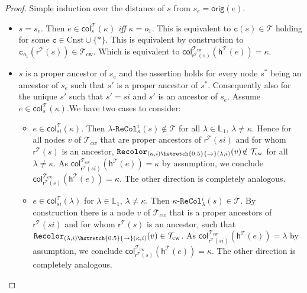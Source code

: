 \documentclass[10pt,a4paper]{amsart}
\theoremstyle{definition}
\numberwithin{equation}{section}
\theoremstyle{plain}
\theoremstyle{definition}
\theoremstyle{myexample}
\theoremstyle{plain}
\theoremstyle{definition}
\newcommand{\origcol}{o}
\newcommand{\cols}{\mathbb{L}}
\newcommand{\recol}[2]{#2\pred{\texttt{-}ReCol}_{#1}}
\newcommand{\fcn}[1]{\mathsf{#1}}
\newcommand{\col}{\fcn{col}}
\newcommand{\pred}[1]{\mathtt{#1}}
\newcommand{\const}[1]{\mathtt{#1}}
\newcommand{\iffi}{\textit{iff} } %
\newcommand{\shortto}{\hstretch{0.5}{\to}}
\begin{document}
\begin{proof}
	Simple induction over the distance of $s$ from $s_e = \fcn{orig}(e)$.
	\begin{itemize}
		\item $s = s_e$. Then $e\in\col_s^{\mathcal{T}}(\kappa)$ \iffi $\kappa = \origcol_1$. This is equivalent to $\const{c}(s)\in\mathcal{T}$ holding for some $\const{c}\in\mathrm{Cnst}{\cup}\{ \ast \}$. This is equivalent by construction to $\const{c}_{\origcol_1}(\fcn{r}^{\mathcal{T}}\!(s))\in\mathcal{T}_{\mathrm{cw}}$. Which is equivalent to $\col_{\fcn{r}^{\mathcal{T}}\!(s)}^{\mathcal{T}_{\mathrm{cw}}}(\fcn{h}^{\mathcal{T}}\!(e)) = \kappa$. 
		\item $s$ is a proper ancestor of $s_e$ and the assertion holds for every node $s^{\ast}$ being an ancestor of $s_e$ such that $s'$ is a proper ancestor of $s^{\ast}$. Consequently also for the unique $s'$ such that $s'= si $ and $s'$ is an ancestor of $s_e$. 
		Assume $e\in\col_{s}^{\mathcal{T}}(\kappa)$.We have two cases to consider:
		\begin{itemize}
			\item $e\in\col_{si}^{\mathcal{T}}(\kappa)$. Then $\recol{\kappa}{\lambda}^{i}(s)\notin\mathcal{T}$ for all $\lambda\in\cols_1$, $\lambda\neq\kappa$. Hence for all nodes $v$ of $\mathcal{T}_{cw}$ that are proper ancestors of $\fcn{r}^{\mathcal{T}}\!(si)$ and for whom $\fcn{r}^{\mathcal{T}}\!(s)$ is an ancestor, $\pred{Recolor}_{(\kappa, i)\shortto(\lambda, i)}(v)\!\notin\mathcal{T}_{\mathrm{cw}}$ for all $\lambda\neq \kappa$. As $\col_{\fcn{r}^{\mathcal{T}}\!(si)}^{\mathcal{T}_{\mathrm{cw}}}(\fcn{h}^{\mathcal{T}}\!(e)) = \kappa$ by assumption, we conclude $\col_{\fcn{r}^{\mathcal{T}}\!(s)}^{\mathcal{T}_{\mathrm{cw}}}(\fcn{h}^{\mathcal{T}}\!(e)) = \kappa$. The other direction is completely analogous.
			\item $e\in\col_{si}^{\mathcal{T}}(\lambda)$ for $\lambda\in\cols_1$, $\lambda\neq\kappa$. Then $\recol{\lambda}{\kappa}^{i}(s)\in\mathcal{T}$. By construction  there is a node $v$ of $\mathcal{T}_{cw}$ that is a proper ancestors of $\fcn{r}^{\mathcal{T}}\!(si)$ and for whom $\fcn{r}^{\mathcal{T}}\!(s)$ is an ancestor, such that $\pred{Recolor}_{(\lambda, i)\shortto(\kappa, i)}(v)\in\mathcal{T}_{\mathrm{cw}}$. As $\col_{\fcn{r}^{\mathcal{T}}\!(si)}^{\mathcal{T}_{\mathrm{cw}}}(\fcn{h}^{\mathcal{T}}\!(e)) = \lambda$ by assumption, we conclude $\col_{\fcn{r}^{\mathcal{T}}\!(s)}^{\mathcal{T}_{\mathrm{cw}}}(\fcn{h}^{\mathcal{T}}\!(e)) = \kappa$. The other direction is completely analogous. \qedhere
		\end{itemize}
	\end{itemize}
\end{proof}
\end{document}

